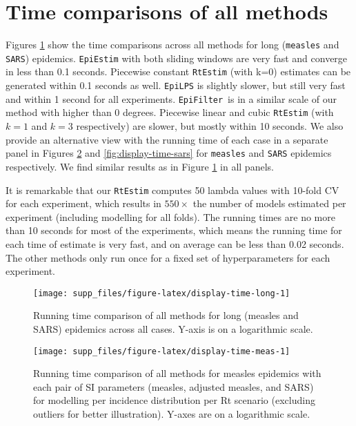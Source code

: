 \documentclass[
]{article}
\begin{document}
\clearpage

\section{Time comparisons of all methods}\label{time-comparisons-of-all-methods}

Figures \ref{fig:display-time-long} show the time comparisons across all methods
for long (\texttt{measles} and \texttt{SARS}) epidemics.
\texttt{EpiEstim} with both sliding windows are very fast and converge in less than 0.1
seconds. Piecewise constant \texttt{RtEstim} (with k=0) estimates can be generated
within 0.1 seconds as well. \texttt{EpiLPS} is slightly slower, but still very fast and
within 1 second for all experiments. \texttt{EpiFilter}~is in a similar scale of our method
with higher than \(0\) degrees. Piecewise linear and cubic \texttt{RtEstim} (with
\(k=1\) and \(k=3\) respectively) are slower, but mostly within 10 seconds.
We also provide an alternative view with the running time of each case in a
separate panel in Figures \ref{fig:display-time-meas} and
\ref{fig:display-time-sars} for \texttt{measles} and \texttt{SARS} epidemics respectively.
We find similar results as in Figure \ref{fig:display-time-long} in all panels.

It is remarkable that our \texttt{RtEstim} computes 50 lambda values with 10-fold CV for
each experiment, which results in \(550\times\) the number of models estimated per experiment
(including modelling for all folds). The running times are no more than 10 seconds
for most of the experiments, which means the running time for each time of estimate
is very fast, and on average can be less than 0.02 seconds. The other methods
only run once for a fixed set of hyperparameters for each experiment.

\begin{figure}[!ht]

{\centering \texttt{[image: supp\_files/figure-latex/display-time-long-1]} 

}

\caption{Running time comparison of all methods for long (measles and SARS) epidemics across all cases. Y-axis is on a logarithmic scale.}\label{fig:display-time-long}
\end{figure}

\begin{figure}[!ht]

{\centering \texttt{[image: supp\_files/figure-latex/display-time-meas-1]} 

}

\caption{Running time comparison of all methods for measles epidemics with each pair of SI parameters (measles, adjusted measles, and SARS) for modelling per incidence distribution per Rt scenario (excluding outliers for better illustration). Y-axes are on a logarithmic scale.}\label{fig:display-time-meas}
\end{figure}
\end{document}
